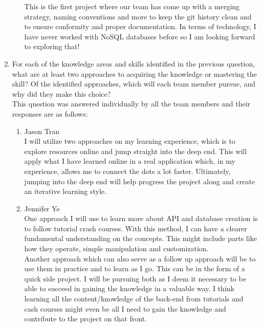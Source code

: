 \documentclass[12pt]{article}
\begin{document}
\begin{enumerate}
\begin{enumerate}
    This is the first project where our team has come up with a merging strategy, naming conventions and more to keep the git history clean and to ensure conformity and proper documentation.
    In terms of technology, I have never worked with NoSQL databases before so I am looking forward to exploring that!
  \end{enumerate}
  \item For each of the knowledge areas and skills identified in the previous
  question, what are at least two approaches to acquiring the knowledge or
  mastering the skill?  Of the identified approaches, which will each team
  member pursue, and why did they make this choice?\\

  This question was answered individually by all the team members and their responses are as follows:\\
  \begin{enumerate}
    \item Jason Tran\\
    I will utilize two approaches on my learning experience, which is to explore resources online and jump straight into the deep end. This will apply what I have learned online in a real application
    which, in my experience, allows me to connect the dots a lot faster. Ultimately, jumping into the deep end will help progress the project along and create an iterative learning style.
    \newline
    \item Jennifer Ye\\
    One approach I will use to learn more about API and database creation is to follow tutorial crash courses. With this method, I can have a clearer fundamental understanding on the concepts.
    This might include parts like how they operate, simple manipulation and customization.\\
    
    Another approach which can also serve as a follow up approach will be to use them in practice and to learn as I go. This can be in the form of a quick side project. I will be pursuing both as
    I deem it necessary to be able to succeed in gaining the knowledge in a valuable way. I think learning all the content/knowledge of the back-end from tutorials and cash courses might even be all
    I need to gain the knowledge and contribute to the project on that front.\\
    

\end{enumerate}
\end{enumerate}
\end{document}

